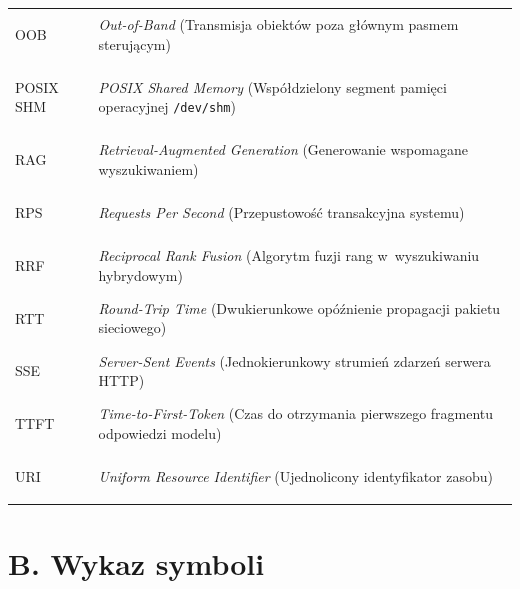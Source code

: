 \begin{longtable}[l]{>{\bfseries\raggedright\arraybackslash}p{2.8cm} >{\raggedright\arraybackslash}p{12.0cm}}
OOB & \emph{Out-of-Band} (Transmisja obiektów poza głównym pasmem sterującym) \\[1.5pt]
POSIX SHM & \emph{POSIX Shared Memory} (Współdzielony segment pamięci operacyjnej \texttt{/dev/shm}) \\[1.5pt]
RAG & \emph{Retrieval-Augmented Generation} (Generowanie wspomagane wyszukiwaniem) \\[1.5pt]
RPS & \emph{Requests Per Second} (Przepustowość transakcyjna systemu) \\[1.5pt]
RRF & \emph{Reciprocal Rank Fusion} (Algorytm fuzji rang w~wyszukiwaniu hybrydowym) \\[1.5pt]
RTT & \emph{Round-Trip Time} (Dwukierunkowe opóźnienie propagacji pakietu sieciowego) \\[1.5pt]
SSE & \emph{Server-Sent Events} (Jednokierunkowy strumień zdarzeń serwera HTTP) \\[1.5pt]
TTFT & \emph{Time-to-First-Token} (Czas do otrzymania pierwszego fragmentu odpowiedzi modelu) \\[1.5pt]
URI & \emph{Uniform Resource Identifier} (Ujednolicony identyfikator zasobu) \\
\end{longtable}

\section*{B. Wykaz symboli}


